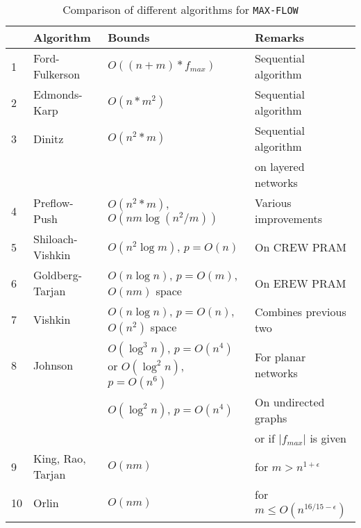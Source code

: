 \documentclass[a4paper,10pt, twocolumn]{article}
\begin{document}
\begin{table*}
\begin{center}
\begin{tabular}{llll}
\hline
&\textbf{Algorithm} & \textbf{Bounds} & \textbf{Remarks} \\
\hline
1 & Ford-Fulkerson~\cite{ahuja93} & $O((n+m) * f_{max})$ & Sequential algorithm \\
2 & Edmonds-Karp~\cite{ahuja93} & $O(n*m^2)$ & Sequential algorithm  \\
3 & Dinitz~\cite{dinitz70}& $O(n^2*m)$ & Sequential algorithm \\
  & & & on layered networks\\
4 & Preflow-Push~\cite{ahuja93} & $O(n^2*m)$, $O(nm \log(n^2/m))$ & Various improvements\\
5 & Shiloach-Vishkin~\cite{yossi81} & $O(n^2 \log m)$, $p=O(n)$ & On CREW PRAM\\
6 & Goldberg-Tarjan~\cite{goldberg89} & $O(n \log n)$, $p=O(m)$, $O(nm)$ space & On EREW PRAM \\
7 & Vishkin~\cite{vishkin92} & $O(n \log n)$, $p=O(n)$, $O(n^2)$ space & Combines previous two\\
8 & Johnson~\cite{johnson87} & $O(\log^{3} n)$, $p=O(n^{4})$ or $O(\log^{2} n)$, $p=O(n^{6})$ &
For planar networks\\
  & & $	O(\log^{2} n)$, $p=O(n^{4})$ & On undirected graphs \\
  & & & or if  $\lvert f_{max} \rvert$ is given\\
9 & King, Rao, Tarjan~\cite{King94} & $O(nm)$ & for $m > n^{1+\epsilon}$ \\
10 & Orlin~\cite{Orlin13} & $O(nm)$ & for $m \leq O(n^{16/15 - \epsilon})$ \\
\hline
\end{tabular}
\caption{Comparison of different algorithms for \lstinline|MAX-FLOW|}
\label{tbl:results}
\end{center}
\end{table*}
\end{document}
